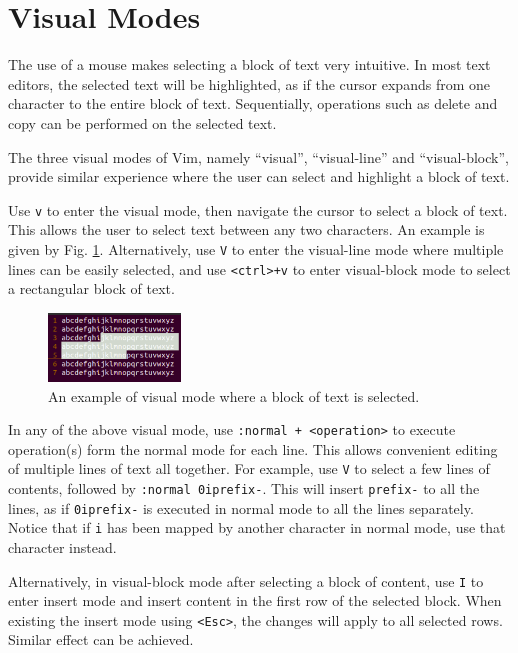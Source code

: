 \section{Visual Modes}

The use of a mouse makes selecting a block of text very intuitive. In most text editors, the selected text will be highlighted, as if the cursor expands from one character to the entire block of text. Sequentially, operations such as delete and copy can be performed on the selected text.

The three visual modes of Vim, namely ``visual'', ``visual-line'' and ``visual-block'', provide similar experience where the user can select and highlight a block of text.

Use \verb|v| to enter the visual mode, then navigate the cursor to select a block of text. This allows the user to select text between any two characters. An example is given by Fig. \ref{ch:tfe:fig:vimvm1}. Alternatively, use \verb|V| to enter the visual-line mode where multiple lines can be easily selected, and use \verb|<ctrl>+v| to enter visual-block mode to select a rectangular block of text.

\begin{figure}[htbp]
	\centering
	\includegraphics[width=100pt]{chapters/part-1/figures/vimvm1.png}
	\caption{An example of visual mode where a block of text is selected.} \label{ch:tfe:fig:vimvm1}
\end{figure}

In any of the above visual mode, use \verb|:normal + <operation>| to execute operation(s) form the normal mode for each line. This allows convenient editing of multiple lines of text all together. For example, use \verb|V| to select a few lines of contents, followed by \verb|:normal 0iprefix-|. This will insert \verb|prefix-| to all the lines, as if \verb|0iprefix-| is executed in normal mode to all the lines separately. Notice that if \verb|i| has been mapped by another character in normal mode, use that character instead.

Alternatively, in visual-block mode after selecting a block of content, use \verb|I| to enter insert mode and insert content in the first row of the selected block. When existing the insert mode using \verb|<Esc>|, the changes will apply to all selected rows. Similar effect can be achieved.

